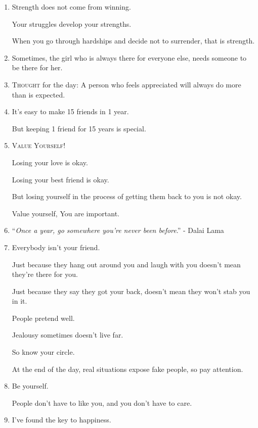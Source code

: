 \documentclass{article}
\numberwithin{equation}{section}
\begin{document}
\begin{enumerate}
    And even if they screw you over, you'll still be there for them.
    
    Because that's you, that who you are.
    
    Once you get attached to someone, they capture your heart and they always have a place there.
    
    And that is why it's so hard for you to let him go.
    \item Strength does not come from winning.
    
    Your struggles develop your strengths.
    
    When you go through hardships and decide not to surrender, that is strength.
    \item Sometimes, the girl who is always there for everyone else, needs someone to be there for her.
    \item \textsc{Thought} for the day: A person who feels appreciated will always do more than is expected.
    \item It's easy to make 15 friends in 1 year.
    
    But keeping 1 friend for 15 years is special.
    \item \textsc{Value Yourself!}
    
    Losing your love is okay.
    
    Losing your best friend is okay.
    
    But losing yourself in the process of getting them back to you is not okay.
    
    Value yourself, You are important.
    \item ``\textit{Once a year, go somewhere you're never been before}.'' - Dalai Lama
    \item Everybody isn't your friend.
    
    Just because they hang out around you and laugh with you doesn't mean they're there for you.
    
    Just because they say they got your back, doesn't mean they won't stab you in it.
    
    People pretend well.
    
    Jealousy sometimes doesn't live far.
    
    So know your circle.
    
    At the end of the day, real situations expose fake people, so pay attention.
    \item Be yourself.
    
    People don't have to like you, and you don't have to care.
    \item I've found the key to happiness.
    

\end{enumerate}
\end{document}
